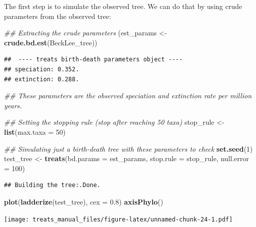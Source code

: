 \documentclass[
]{book}
\newenvironment{Shaded}{\begin{snugshade}}{\end{snugshade}}
\newcommand{\CommentTok}[1]{\textcolor[rgb]{0.56,0.35,0.01}{\textit{#1}}}
\newcommand{\DataTypeTok}[1]{\textcolor[rgb]{0.13,0.29,0.53}{#1}}
\newcommand{\DecValTok}[1]{\textcolor[rgb]{0.00,0.00,0.81}{#1}}
\newcommand{\FloatTok}[1]{\textcolor[rgb]{0.00,0.00,0.81}{#1}}
\newcommand{\KeywordTok}[1]{\textcolor[rgb]{0.13,0.29,0.53}{\textbf{#1}}}
\newcommand{\NormalTok}[1]{#1}
\newcommand{\StringTok}[1]{\textcolor[rgb]{0.31,0.60,0.02}{#1}}
\begin{document}
The first step is to simulate the observed tree.
We can do that by using crude parameters from the observed tree:

\begin{Shaded}
\begin{Highlighting}[]
\CommentTok{\#\# Extracting the crude parameters}
\NormalTok{(est\_params \textless{}{-}}\StringTok{ }\KeywordTok{crude.bd.est}\NormalTok{(BeckLee\_tree))}
\end{Highlighting}
\end{Shaded}

\begin{verbatim}
##  ---- treats birth-death parameters object ---- 
## speciation: 0.352.
## extinction: 0.288.
\end{verbatim}

\begin{Shaded}
\begin{Highlighting}[]
\CommentTok{\#\# These parameters are the observed speciation and extinction rate per million years.}

\CommentTok{\#\# Setting the stopping rule (stop after reaching 50 taxa)}
\NormalTok{stop\_rule \textless{}{-}}\StringTok{ }\KeywordTok{list}\NormalTok{(}\DataTypeTok{max.taxa =} \DecValTok{50}\NormalTok{)}

\CommentTok{\#\# Simulating just a birth{-}death tree with these parameters to check}
\KeywordTok{set.seed}\NormalTok{(}\DecValTok{1}\NormalTok{)}
\NormalTok{test\_tree \textless{}{-}}\StringTok{ }\KeywordTok{treats}\NormalTok{(}\DataTypeTok{bd.params  =}\NormalTok{ est\_params,}
                    \DataTypeTok{stop.rule  =}\NormalTok{ stop\_rule,}
                    \DataTypeTok{null.error =} \DecValTok{100}\NormalTok{)}
\end{Highlighting}
\end{Shaded}

\begin{verbatim}
## Building the tree:.Done.
\end{verbatim}

\begin{Shaded}
\begin{Highlighting}[]
\KeywordTok{plot}\NormalTok{(}\KeywordTok{ladderize}\NormalTok{(test\_tree), }\DataTypeTok{cex =} \FloatTok{0.8}\NormalTok{)}
\KeywordTok{axisPhylo}\NormalTok{()}
\end{Highlighting}
\end{Shaded}

\texttt{[image: treats\_manual\_files/figure-latex/unnamed-chunk-24-1.pdf]}
\end{document}
